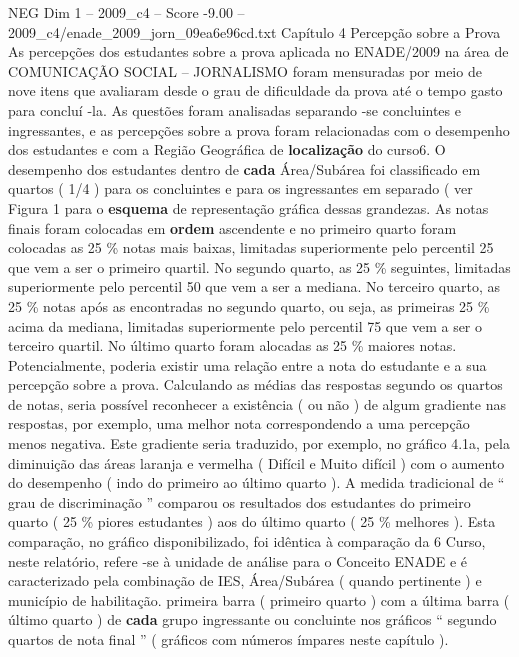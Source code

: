 \begin{textsample}{NEG Dim 1 – 2009\_c4 – Score -9.00 – 2009\_c4/enade\_2009\_jorn\_09ea6e96cd.txt}  \label{ex:f1_neg_022}
Capítulo 4 Percepção sobre a Prova As percepções dos estudantes sobre a prova aplicada no ENADE/2009 na área de COMUNICAÇÃO SOCIAL – JORNALISMO foram mensuradas por meio de nove itens que avaliaram desde o grau de dificuldade da prova até o tempo gasto para concluí -la.
As questões foram analisadas separando -se concluintes e ingressantes, e as percepções sobre a prova foram relacionadas com o desempenho dos estudantes e com a Região Geográfica de \textbf{localização} do curso6.
O desempenho dos estudantes dentro de \textbf{cada} Área/Subárea foi classificado em quartos ( 1/4 ) para os concluintes e para os ingressantes em separado ( ver Figura 1 para o \textbf{esquema} de representação gráfica dessas grandezas.
As notas finais foram colocadas em \textbf{ordem} ascendente e no primeiro quarto foram colocadas as 25 \% notas mais baixas, limitadas superiormente pelo percentil 25 que vem a ser o primeiro quartil.
No segundo quarto, as 25 \% seguintes, limitadas superiormente pelo percentil 50 que vem a ser a mediana.
No terceiro quarto, as 25 \% notas após as encontradas no segundo quarto, ou seja, as primeiras 25 \% acima da mediana, limitadas superiormente pelo percentil 75 que vem a ser o terceiro quartil.
No último quarto foram alocadas as 25 \% maiores notas.
Potencialmente, poderia existir uma relação entre a nota do estudante e a sua percepção sobre a prova.
Calculando as médias das respostas segundo os quartos de notas, seria possível reconhecer a existência ( ou não ) de algum gradiente nas respostas, por exemplo, uma melhor nota correspondendo a uma percepção menos negativa.
Este gradiente seria traduzido, por exemplo, no gráfico 4.1a, pela diminuição das áreas laranja e vermelha ( Difícil e Muito difícil ) com o aumento do desempenho ( indo do primeiro ao último quarto ).
A medida tradicional de “ grau de discriminação ” comparou os resultados dos estudantes do primeiro quarto ( 25 \% piores estudantes ) aos do último quarto ( 25 \% melhores ).
Esta comparação, no gráfico disponibilizado, foi idêntica à comparação da 6 Curso, neste relatório, refere -se à unidade de análise para o Conceito ENADE e é caracterizado pela combinação de IES, Área/Subárea ( quando pertinente ) e município de habilitação. primeira barra ( primeiro quarto ) com a última barra ( último quarto ) de \textbf{cada} grupo ingressante ou concluinte nos gráficos “ segundo quartos de nota final ” ( gráficos com números ímpares neste capítulo ).

\end{textsample}
